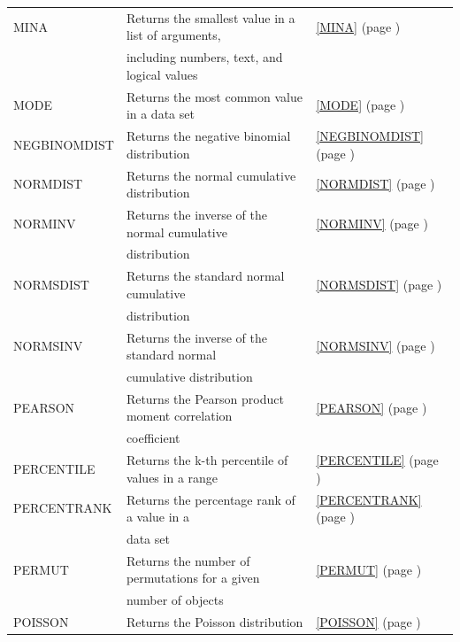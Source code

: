 \begin{center}
\begin{longtable}{l l l }
		MINA  & Returns the smallest value in a list of arguments,  &  \ref{MINA} (page \pageref{MINA}) \index{Spreadsheet Functions!MINA} \\
		& including numbers, text, and logical values &   \\
		MODE  & Returns the most common value in a data set &  \ref{MODE} (page \pageref{MODE}) \index{Spreadsheet Functions!MODE} \\
		NEGBINOMDIST & Returns the negative binomial distribution &  \ref{NEGBINOMDIST} (page \pageref{NEGBINOMDIST}) \index{Spreadsheet Functions!NEGBINOMDIST} \\
		NORMDIST & Returns the normal cumulative distribution &  \ref{NORMDIST} (page \pageref{NORMDIST}) \index{Spreadsheet Functions!NORMDIST} \\
		NORMINV & Returns the inverse of the normal cumulative &  \ref{NORMINV} (page \pageref{NORMINV}) \index{Spreadsheet Functions!NORMINV} \\
		& distribution &   \\
		NORMSDIST & Returns the standard normal cumulative  &  \ref{NORMSDIST} (page \pageref{NORMSDIST}) \index{Spreadsheet Functions!NORMSDIST} \\
		& distribution &   \\
		NORMSINV & Returns the inverse of the standard normal &  \ref{NORMSINV} (page \pageref{NORMSINV}) \index{Spreadsheet Functions!NORMSINV} \\
		& cumulative distribution &   \\
		PEARSON & Returns the Pearson product moment correlation &  \ref{PEARSON} (page \pageref{PEARSON}) \index{Spreadsheet Functions!PEARSON} \\
		& coefficient &   \\
		PERCENTILE & Returns the k-th percentile of values in a range &  \ref{PERCENTILE} (page \pageref{PERCENTILE}) \index{Spreadsheet Functions!PERCENTILE} \\
		PERCENTRANK & Returns the percentage rank of a value in a  &  \ref{PERCENTRANK} (page \pageref{PERCENTRANK}) \index{Spreadsheet Functions!PERCENTRANK} \\
		& data set &   \\ 
		PERMUT & Returns the number of permutations for a given &  \ref{PERMUT} (page \pageref{PERMUT}) \index{Spreadsheet Functions!PERMUT} \\
		& number of objects &   \\
		POISSON & Returns the Poisson distribution &  \ref{POISSON} (page \pageref{POISSON}) \index{Spreadsheet Functions!POISSON} \\

\end{longtable}
\end{center}

